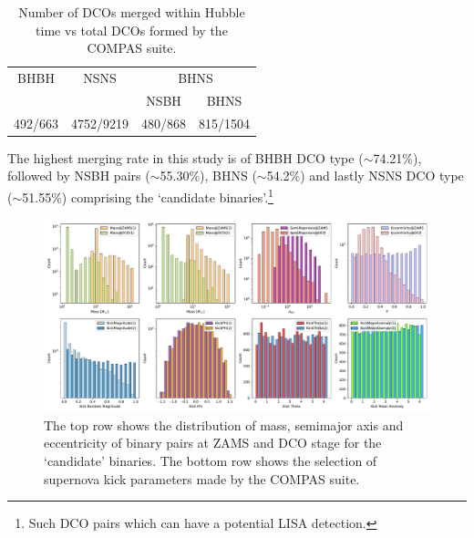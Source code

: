 \documentclass[journal, twocolumn]{IEEEtran}
\begin{document}
    \begin{table}[!ht]
        \centering
        \begin{tabular}{@{}cccc@{}}
            \toprule
            \multirow{2.5}{*}{BHBH} & \multirow{2.5}{*}{NSNS} & \multicolumn{2}{c}{BHNS} \\ \cmidrule(l){3-4}
            &           & NSBH    & BHNS     \\ \midrule
            492/663 & 4752/9219 & 480/868 & 815/1504 \\ \bottomrule
        \end{tabular}%
        \caption{Number of DCOs merged within Hubble time vs total DCOs formed by the COMPAS suite.}
        \label{tab:dco_details}
    \end{table}

    The highest merging rate in this study is of BHBH DCO type ($\sim$74.21\%), followed by NSBH pairs ($\sim$55.30\%), BHNS ($\sim$54.2\%) and lastly NSNS DCO type ($\sim$51.55\%) comprising the `candidate binaries'.\footnote{Such DCO pairs which can have a potential LISA detection.}

    \begin{figure}[!h]%
        \centering
        \includegraphics[width=\textwidth]{analysis_data/main_analysis_folder/all_zams_params}
        \caption{The top row shows the distribution of mass, semimajor axis and eccentricity of binary pairs at ZAMS and DCO stage for the `candidate' binaries. The bottom row shows the selection of supernova kick parameters made by the COMPAS suite.}
        \label{fig:all_zams_params}
    \end{figure}%
\end{document}
